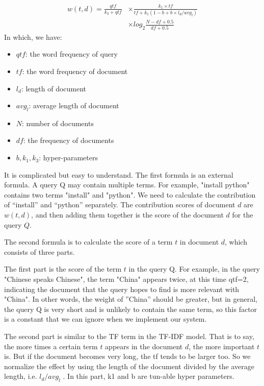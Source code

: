 \documentclass[10pt,journal,compsoc]{IEEEtran}
\begin{document}
\begin{equation*}
\begin{aligned}
w(t, d) = \frac{qtf}{k_3 + qtf} &\times \frac{k_1\times tf}{tf+k_1(1-b+b\times l_d / avg_l)} \\ 
&\times log_2\frac{N-df+0.5}{df+0.5}
\end{aligned}
\end{equation*}
In which, we have:
\begin{itemize}
    \item $qtf$: the word frequency of query
    \item $tf$: the word frequency of document
    \item $l_d$: length of document
    \item $avg_l$: average length of document
    \item $N$: number of documents
    \item $df$: the frequency of documents
    \item $b, k_1, k_3$: hyper-parameters
\end{itemize}

It is complicated but easy to understand. The first formula is an external formula. A query Q may contain multiple terms. For example, "install python" contains two terms "install" and "python". We need to calculate the contribution of “install” and “python” separately. The contribution scores of document $d$ are $w(t,d)$, and then adding them together is the score of the document $d$ for the query $Q$.

The second formula is to calculate the score of a term $t$ in document $d$, which consists of three parts. 

The first part is the score of the term $t$ in the query Q. For example, in the query "Chinese speaks Chinese", the term "China" appears twice, at this time qtf=2, indicating the document that the query hopes to find is more relevant with "China". In other words, the weight of ”China” should be greater, but in general, the query Q is very short and is unlikely to contain the same term, so this factor is a constant that we can ignore when we implement our system.

The second part is similar to the TF term in the TF-IDF model. That is to say, the more times a certain term $t$ appears in the document $d$, the more important $t$ is. But if the document becomes very long, the tf tends to be larger too. So we normalize the effect by using the length of the document divided by the average length, i.e. $l_d/avg_l$ . In this part, k1 and b are tun-able hyper parameters.
\end{document}
